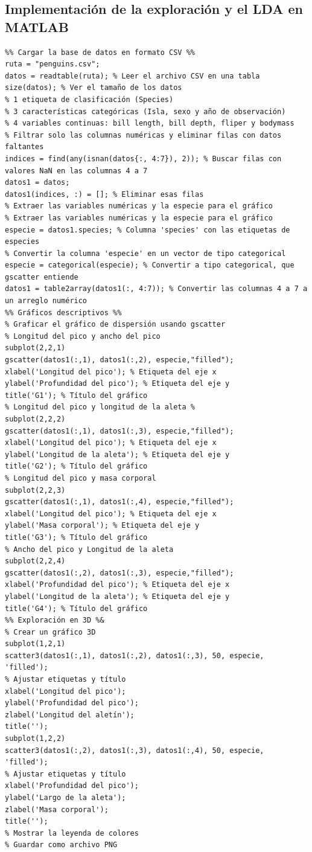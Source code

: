 \documentclass[11pt, letterpaper]{article}
\begin{document}
\subsection{Implementación de la exploración y el LDA en MATLAB}
\begin{verbatim}
%% Cargar la base de datos en formato CSV %%
ruta = "penguins.csv";
datos = readtable(ruta); % Leer el archivo CSV en una tabla
size(datos); % Ver el tamaño de los datos
% 1 etiqueta de clasificación (Species)
% 3 características categóricas (Isla, sexo y año de observación)
% 4 variables continuas: bill length, bill depth, fliper y bodymass
% Filtrar solo las columnas numéricas y eliminar filas con datos faltantes
indices = find(any(isnan(datos{:, 4:7}), 2)); % Buscar filas con valores NaN en las columnas 4 a 7
datos1 = datos;
datos1(indices, :) = []; % Eliminar esas filas
% Extraer las variables numéricas y la especie para el gráfico
% Extraer las variables numéricas y la especie para el gráfico
especie = datos1.species; % Columna 'species' con las etiquetas de especies
% Convertir la columna 'especie' en un vector de tipo categorical
especie = categorical(especie); % Convertir a tipo categorical, que gscatter entiende
datos1 = table2array(datos1(:, 4:7)); % Convertir las columnas 4 a 7 a un arreglo numérico
%% Gráficos descriptivos %%
% Graficar el gráfico de dispersión usando gscatter
% Longitud del pico y ancho del pico
subplot(2,2,1)
gscatter(datos1(:,1), datos1(:,2), especie,"filled"); 
xlabel('Longitud del pico'); % Etiqueta del eje x
ylabel('Profundidad del pico'); % Etiqueta del eje y
title('G1'); % Título del gráfico
% Longitud del pico y longitud de la aleta %
subplot(2,2,2)
gscatter(datos1(:,1), datos1(:,3), especie,"filled");
xlabel('Longitud del pico'); % Etiqueta del eje x
ylabel('Longitud de la aleta'); % Etiqueta del eje y
title('G2'); % Título del gráfico
% Longitud del pico y masa corporal
subplot(2,2,3)
gscatter(datos1(:,1), datos1(:,4), especie,"filled");
xlabel('Longitud del pico'); % Etiqueta del eje x
ylabel('Masa corporal'); % Etiqueta del eje y
title('G3'); % Título del gráfico
% Ancho del pico y Longitud de la aleta
subplot(2,2,4)
gscatter(datos1(:,2), datos1(:,3), especie,"filled");
xlabel('Profundidad del pico'); % Etiqueta del eje x
ylabel('Longitud de la aleta'); % Etiqueta del eje y
title('G4'); % Título del gráfico
%% Exploración en 3D %&
% Crear un gráfico 3D
subplot(1,2,1)
scatter3(datos1(:,1), datos1(:,2), datos1(:,3), 50, especie, 'filled'); 
% Ajustar etiquetas y título
xlabel('Longitud del pico');
ylabel('Profundidad del pico');
zlabel('Longitud del aletín');
title('');
subplot(1,2,2)
scatter3(datos1(:,2), datos1(:,3), datos1(:,4), 50, especie, 'filled'); 
% Ajustar etiquetas y título
xlabel('Profundidad del pico');
ylabel('Largo de la aleta');
zlabel('Masa corporal');
title('');
% Mostrar la leyenda de colores
% Guardar como archivo PNG


\end{verbatim}
\end{document}
